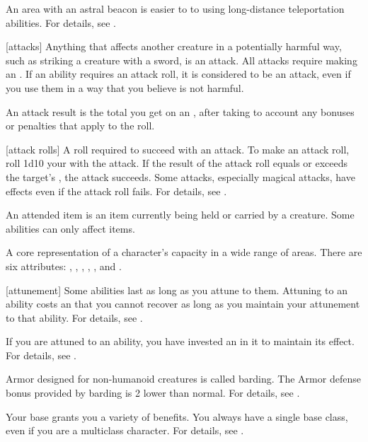  An area with an astral beacon is easier to  to using long-distance teleportation abilities.
For details, see .

[attacks] Anything that affects another creature in a potentially harmful way, such as striking a creature with a sword, is an attack.
All attacks require making an .
If an ability requires an attack roll, it is considered to be an attack, even if you use them in a way that you believe is not harmful.

 An attack result is the total you get on an , after taking to account any bonuses or penalties that apply to the roll.

[attack rolls] A roll required to succeed with an attack.
To make an attack roll, roll 1d10 \add your  with the attack.
If the result of the attack roll equals or exceeds the target's , the attack succeeds.
Some attacks, especially magical attacks, have effects even if the attack roll fails.
For details, see .

 An attended item is an item currently being held or carried by a creature.
Some abilities can only affect  items.

 A core representation of a character's capacity in a wide range of areas. There are six attributes: , , , , , and .

[attunement] Some abilities last as long as you attune to them.
Attuning to an ability costs an  that you cannot recover as long as you maintain your attunement to that ability.
For details, see .

 If you are attuned to an ability, you have invested an  in it to maintain its effect.
For details, see .

 Armor designed for non-humanoid creatures is called barding.
The Armor defense bonus provided by barding is 2 lower than normal.
For details, see .

 Your base  grants you a variety of benefits.
You always have a single base class, even if you are a multiclass character.
For details, see .

